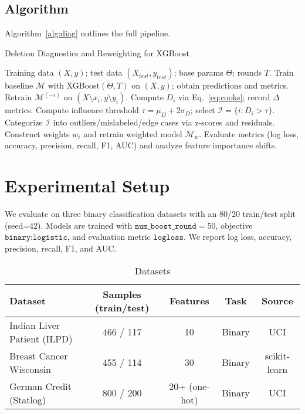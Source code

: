 \documentclass[sn-basic]{sn-jnl} %
\begin{document}
\subsection{Algorithm}
Algorithm~\ref{alg:diag} outlines the full pipeline.

\begin{algorithm}[H]
\caption{Deletion Diagnostics and Reweighting for XGBoost}
\label{alg:diag}
\begin{algorithmic}[1]
\Require Training data $(X, y)$; test data $(X_{test}, y_{test})$; base params $\Theta$; rounds $T$.
\State Train baseline $\mathcal{M}$ with XGBoost$(\Theta, T)$ on $(X,y)$; obtain predictions and metrics.
  \State Retrain $\mathcal{M}^{(-i)}$ on $(X\setminus x_i, y\setminus y_i)$.
  \State Compute $D_i$ via Eq.~\eqref{eq:cooks}; record $\Delta$metrics.
\EndFor
\State Compute influence threshold $\tau=\mu_D+2\sigma_D$; select $\mathcal{I}=\{i: D_i>\tau\}$.
\State Categorize $\mathcal{I}$ into outliers/mislabeled/edge cases via z-scores and residuals.
\State Construct weights $w_i$ and retrain weighted model $\mathcal{M}_w$.
\State Evaluate metrics (log loss, accuracy, precision, recall, F1, AUC) and analyze feature importance shifts.
\end{algorithmic}
\end{algorithm}

\section{Experimental Setup}
We evaluate on three binary classification datasets with an 80/20 train/test split (seed=42). Models are trained with $\texttt{num\_boost\_round}=50$, objective $\texttt{binary:logistic}$, and evaluation metric $\texttt{logloss}$. We report log loss, accuracy, precision, recall, F1, and AUC.

\begin{table}[H]
\centering
\caption{Datasets}
\label{tab:datasets}
\begin{tabular}{lcccc}
\toprule
Dataset & Samples (train/test) & Features & Task & Source \\
\midrule
Indian Liver Patient (ILPD) & 466 / 117 & 10 & Binary & UCI \\
Breast Cancer Wisconsin & 455 / 114 & 30 & Binary & scikit-learn \\
German Credit (Statlog) & 800 / 200 & 20+ (one-hot) & Binary & UCI \\
\bottomrule
\end{tabular}
\end{table}
\end{document}

